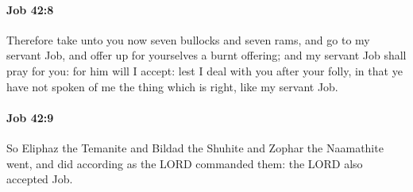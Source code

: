 		\paragraph{Job 42:8} %
			\label{JOB-42-8}

			Therefore take unto you now seven bullocks and seven rams, and go to my servant Job, and offer up for yourselves a burnt offering; and my servant Job shall pray for you: for him will I accept: lest I deal with you after your folly, in that ye have not spoken of me the thing which is right, like my servant Job.


		\paragraph{Job 42:9} %
			\label{JOB-42-9}

			So Eliphaz the Temanite and Bildad the Shuhite and Zophar the Naamathite went, and did according as the LORD commanded them: the LORD also accepted Job.

